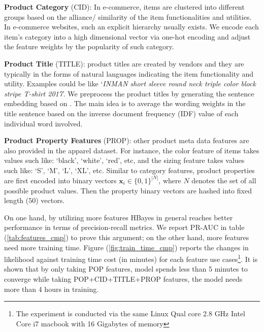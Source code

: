 {\textbf{Product Category} (CID): In e-commerce, items are clustered into different groups based on the alliance/ similarity of the item functionalities and utilities.  In e-commerce websites, such an explicit hierarchy usually exists.  We encode each item's category into a high dimensional vector via one-hot encoding and adjust the feature weights by the popularity of such category. \newline

\textbf{Product Title} (TITLE): product titles are created by vendors and they are typically in the forms of natural languages indicating the item functionality and utility.  Examples could be like `\emph{INMAN short sleeve round neck triple color block stripe T-shirt 2017}'.  We preprocess the product titles by generating the sentence embedding based on \cite{de2016representation}.  The main idea is to average the wording weights in the title sentence based on the inverse document frequency (IDF) value of each individual word involved. \newline

\textbf{Product Property Features} (PROP): other product meta data features are also provided in the apparel dataset. For instance, the color feature of items takes values such like: `black', `white', `red', etc, and the sizing feature takes values such like: `S', `M', `L', `XL', etc.  Similar to category features, product properties are first encoded into binary vectors $\bm{x}_i \in \{0, 1\}^{|N|}$, where $N$ denotes the set of all possible product values.  Then the property binary vectors are hashed into fixed length ($50$) vectors. \newline

On one hand, by utilizing more features HBayes in general reaches better performance in terms of precision-recall metrics.  We report PR-AUC in table (\ref{tab:features_cmp}) to prove this argument; on the other hand, more features need more training time.  Figure (\ref{fig:train_time_cmp}) reports the changes in likelihood against training time cost (in minutes) for each feature use cases\footnote{The experiment is conducted via the same Linux Qual core 2.8 GHz Intel Core i7 macbook with 16 Gigabytes of memory}. It is shown that by only taking POP features, model spends less than 5 minutes to converge while taking POP+CID+TITLE+PROP features, the model needs more than 4 hours in training.   

\begin{table}[htb]
\centering
{}
\caption{Model performance under different feature combinations in terms of PR AUC}
\label{tab:features_cmp}
\end{table}

}
